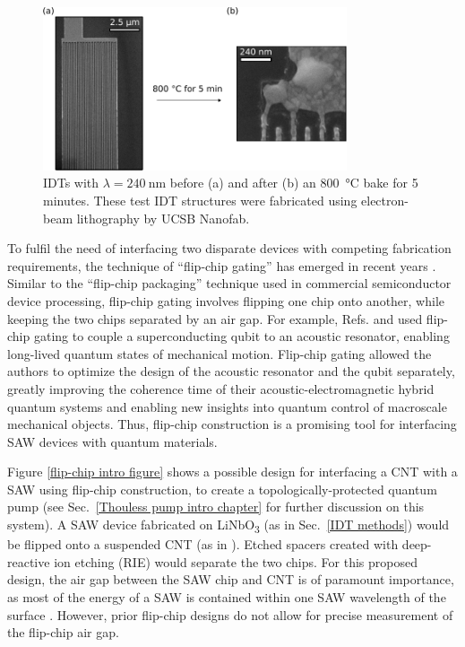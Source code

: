 \documentclass{beavtex_dub_edit}
\begin{document}
\begin{figure}
    \includegraphics[width = 0.8\textwidth]{IDT damaged.pdf}
    \caption{IDTs with $\lambda = \SI{240}{\nano\meter}$ before (a) and after (b) an \SI{800}{\celsius} bake for 5 minutes. These test IDT structures were fabricated using electron-beam lithography by UCSB Nanofab.} 
    \label{IDT damaged}
\end{figure}

To fulfil the need of interfacing two disparate devices with competing fabrication requirements, the technique of “flip-chip gating” has emerged in recent years \cite{beukman_noninvasive_2015, chu_creation_2018, satzinger_quantum_2018, robertson_non-invasive_2020}. Similar to the “flip-chip packaging” technique used in commercial semiconductor device processing, flip-chip gating involves flipping one chip onto another, while keeping the two chips separated by an air gap. For example, Refs. \cite{chu_creation_2018} and \cite{satzinger_quantum_2018} used flip-chip gating to couple a superconducting qubit to an acoustic resonator, enabling long-lived quantum states of mechanical motion. Flip-chip gating allowed the authors to optimize the design of the acoustic resonator and the qubit separately, greatly improving the coherence time of their acoustic-electromagnetic hybrid quantum systems and enabling new insights into quantum control of macroscale mechanical objects. Thus, flip-chip construction is a promising tool for interfacing SAW devices with quantum materials.

Figure \ref{flip-chip intro figure} shows a possible design for interfacing a CNT with a SAW using flip-chip construction, to create a topologically-protected quantum pump (see Sec.\ \ref{Thouless pump intro chapter} for further discussion on this system). A SAW device fabricated on LiNbO\textsubscript{3} (as in Sec.\ \ref{IDT methods}) would be flipped onto a suspended CNT (as in \cite{senger_universal_2018}). Etched spacers created with deep-reactive ion etching (RIE) would separate the two chips. For this proposed design, the air gap between the SAW chip and CNT is of paramount importance, as most of the energy of a SAW is contained within one SAW wavelength of the surface \cite{wixforth_surface_1989}. However, prior flip-chip designs do not allow for precise measurement of the flip-chip air gap.
\end{document}
